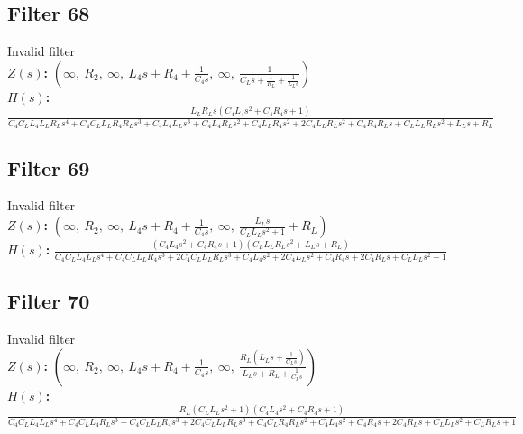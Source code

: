 \documentclass{article}
\begin{document}
\subsection*{Filter 68}
Invalid filter \\ 
\textbf{$Z(s)$:} $\left( \infty, \  R_{2}, \  \infty, \  L_{4} s + R_{4} + \frac{1}{C_{4} s}, \  \infty, \  \frac{1}{C_{L} s + \frac{1}{R_{L}} + \frac{1}{L_{L} s}}\right)$ \\ 
\textbf{$H(s)$:} $\frac{L_{L} R_{L} s \left(C_{4} L_{4} s^{2} + C_{4} R_{4} s + 1\right)}{C_{4} C_{L} L_{4} L_{L} R_{L} s^{4} + C_{4} C_{L} L_{L} R_{4} R_{L} s^{3} + C_{4} L_{4} L_{L} s^{3} + C_{4} L_{4} R_{L} s^{2} + C_{4} L_{L} R_{4} s^{2} + 2 C_{4} L_{L} R_{L} s^{2} + C_{4} R_{4} R_{L} s + C_{L} L_{L} R_{L} s^{2} + L_{L} s + R_{L}}$ \\ 
\subsection*{Filter 69}
Invalid filter \\ 
\textbf{$Z(s)$:} $\left( \infty, \  R_{2}, \  \infty, \  L_{4} s + R_{4} + \frac{1}{C_{4} s}, \  \infty, \  \frac{L_{L} s}{C_{L} L_{L} s^{2} + 1} + R_{L}\right)$ \\ 
\textbf{$H(s)$:} $\frac{\left(C_{4} L_{4} s^{2} + C_{4} R_{4} s + 1\right) \left(C_{L} L_{L} R_{L} s^{2} + L_{L} s + R_{L}\right)}{C_{4} C_{L} L_{4} L_{L} s^{4} + C_{4} C_{L} L_{L} R_{4} s^{3} + 2 C_{4} C_{L} L_{L} R_{L} s^{3} + C_{4} L_{4} s^{2} + 2 C_{4} L_{L} s^{2} + C_{4} R_{4} s + 2 C_{4} R_{L} s + C_{L} L_{L} s^{2} + 1}$ \\ 
\subsection*{Filter 70}
Invalid filter \\ 
\textbf{$Z(s)$:} $\left( \infty, \  R_{2}, \  \infty, \  L_{4} s + R_{4} + \frac{1}{C_{4} s}, \  \infty, \  \frac{R_{L} \left(L_{L} s + \frac{1}{C_{L} s}\right)}{L_{L} s + R_{L} + \frac{1}{C_{L} s}}\right)$ \\ 
\textbf{$H(s)$:} $\frac{R_{L} \left(C_{L} L_{L} s^{2} + 1\right) \left(C_{4} L_{4} s^{2} + C_{4} R_{4} s + 1\right)}{C_{4} C_{L} L_{4} L_{L} s^{4} + C_{4} C_{L} L_{4} R_{L} s^{3} + C_{4} C_{L} L_{L} R_{4} s^{3} + 2 C_{4} C_{L} L_{L} R_{L} s^{3} + C_{4} C_{L} R_{4} R_{L} s^{2} + C_{4} L_{4} s^{2} + C_{4} R_{4} s + 2 C_{4} R_{L} s + C_{L} L_{L} s^{2} + C_{L} R_{L} s + 1}$ \\ 
\end{document}

